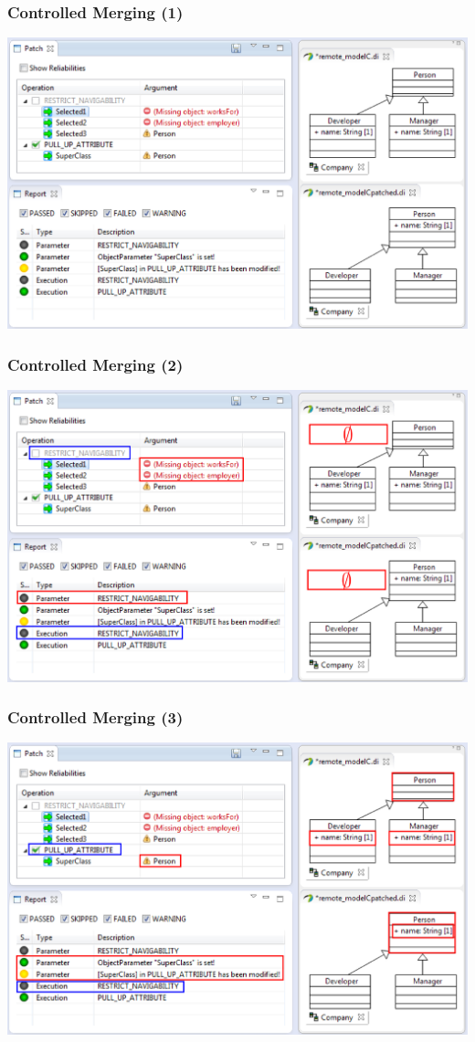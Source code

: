 \begin{frame}
  \frametitle{Controlled Merging (1)}
  \begin{center}
  \includegraphics[scale=0.45]{images/patch_02_1}
  \end{center}
\end{frame}
\begin{frame}[noframenumbering]
  \frametitle{Controlled Merging (2)}
  \begin{center}
  \includegraphics[scale=0.45]{images/patch_02_2}
  \end{center}
\end{frame}
\begin{frame}[noframenumbering]
  \frametitle{Controlled Merging (3)}
  \begin{center}
  \includegraphics[scale=0.45]{images/patch_02_3}
  \end{center}
\end{frame}